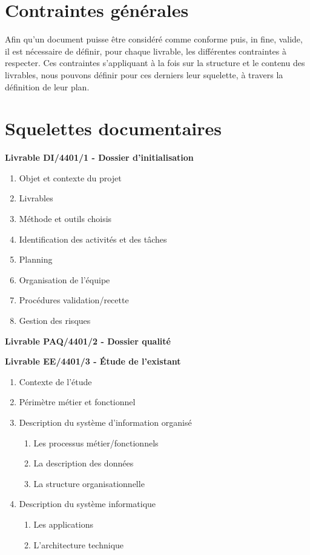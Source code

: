 
\section{Contraintes générales}

Afin qu’un document puisse être considéré comme conforme puis, in fine, valide, il est nécessaire de définir, pour chaque livrable, les différentes contraintes à respecter. Ces contraintes s’appliquant à la fois sur la structure et le contenu des livrables, nous pouvons définir pour ces derniers leur squelette, à travers la définition de leur plan.

\section{Squelettes documentaires}

\bf{Livrable DI/4401/1 - Dossier d’initialisation} \\

\begin{enumerate}
    \item Objet et contexte du projet
    \item Livrables
    \item Méthode et outils choisis
    \item Identification des activités et des tâches
    \item Planning
    \item Organisation de l’équipe
    \item Procédures validation/recette
    \item Gestion des risques \\
\end{enumerate}

\bf{Livrable PAQ/4401/2 - Dossier qualité} \\


\bf{Livrable EE/4401/3 - Étude de l’existant} \\

\begin{enumerate}
    \item Contexte de l'étude
    \item Périmètre métier et fonctionnel
    \item Description du système d'information organisé
        \begin{enumerate}
            \item Les processus métier/fonctionnels
            \item La description des données
            \item La structure organisationnelle
        \end{enumerate}
    \item Description du système informatique
        \begin{enumerate}
            \item Les applications
            \item L'architecture technique \\
        \end{enumerate}
\end{enumerate}

